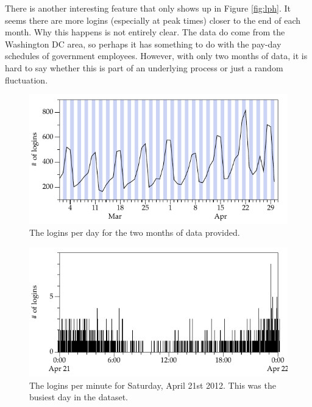 \documentclass{tufte-handout}
\begin{document}
There is another interesting feature that only shows up in Figure \ref{fig:lph}. It seems there are more logins (especially at peak times) closer to the end of each month. Why this happens is not entirely clear. The data do come from the Washington DC area, so perhaps it has something to do with the pay-day schedules of government employees. However, with only two months of data, it is hard to say whether this is part of an underlying process or just a random fluctuation.

\begin{figure}[h]
	\includegraphics[width=\linewidth]{logins_per_day.pdf}%
	\caption{The logins per day for the two months of data provided.}%
	\label{fig:lpd}%
\end{figure}

\begin{figure}[h]
	\includegraphics[width=\linewidth]{logins_per_minute.pdf}%
	\caption{The logins per minute for Saturday, April 21st 2012. This was the busiest day in the dataset.}%
	\label{fig:lpm}%
\end{figure}
\end{document}
